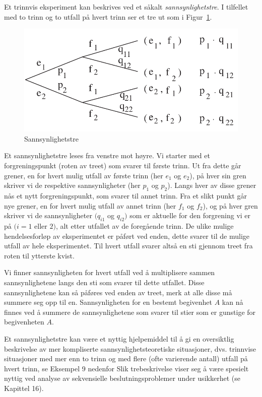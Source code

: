 Et trinnvis eksperiment kan beskrives ved et såkalt {\em
sannsynlighetstre}. I tilfellet med to trinn og to utfall på
hvert trinn ser et tre ut som i Figur~\ref{fig:sannsynlighetstre}. 

\begin{figure}[ht]
\centering \centering
 \includegraphics[scale=0.7]{figurer/fig4_2.pdf} 
 \caption{Sannsynlighetstre}
	\label{fig:sannsynlighetstre}
\end{figure}
Et sannsynlighetstre leses fra venstre mot høyre. Vi starter med
et forgreningspunkt (roten av treet) som svarer til første trinn.
Ut fra dette går grener, en for hvert mulig utfall av første
trinn (her $e_1$ og $e_2$), på hver sin gren skriver vi de
respektive sannsynligheter (her $p_1$ og $p_2$). Langs hver av
disse grener nås et nytt forgreningspunkt, som svarer til annet
trinn. Fra et slikt punkt går nye grener, en for hvert mulig
utfall av annet trinn (her $f_1$ og $f_2$), og på hver gren
skriver vi de sannsynligheter $(q_{i1}$ og $q_{i2})$ som er
aktuelle for den forgrening vi er på $(i=1$ eller $2)$, alt etter
utfallet av de foregående trinn. De ulike mulige hendelsesforløp
av eksperimentet er påført ved enden, dette svarer til de mulige
utfall av hele eksperimentet. Til hvert utfall svarer altså en
sti gjennom treet fra roten til ytterste kvist.

Vi finner sannsynligheten for hvert utfall ved å multiplisere
sammen sannsynlighetene langs den sti som svarer til dette
utfallet. Disse sannsynlighetene kan så påføres ved enden av
treet, merk at alle disse må summere seg opp til en.
Sannsynligheten for en bestemt begivenhet $A$ kan nå finnes ved å
summere de sannsynlighetene som svarer til stier som er gunstige
for begivenheten $A$. 

Et sannsynlighetstre kan være et nyttig hjelpemiddel til å gi en
oversiktlig beskrivelse av mer kompliserte
sannsynlighetsteoretiske situasjoner, dvs. trinnvise situasjoner
med mer enn to trinn og med flere (ofte varierende antall) utfall
på hvert trinn, se Eksempel 9 nedenfor Slik trebeskrivelse viser seg å
være spesielt nyttig ved analyse av sekvensielle 
beslutningsproblemer under usikkerhet (se Kapittel 16).

